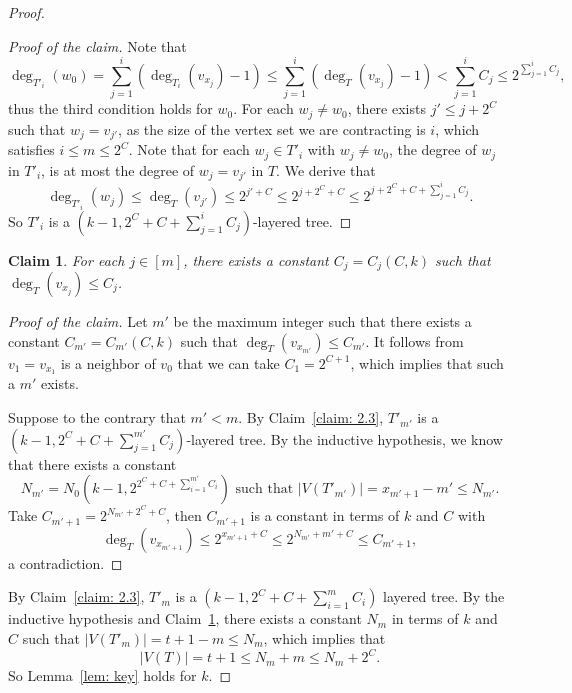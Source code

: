 \documentclass[11pt,a4paper]{article}
\newtheorem{claim}[definition]{Claim}
\newenvironment{poc}{\begin{proof}[Proof of the claim]\renewcommand*{\qedsymbol}{$\blacksquare$}}{\end{proof}}
\begin{document}
\begin{proof}
\begin{poc}
    Note that
        \[
        \deg_{T'_i}(w_0) = \sum_{j=1}^{i} \left(\deg_{T_i}(v_{x_j}) -1 \right) \le \sum_{j=1}^{i} \left(\deg_{T}(v_{x_j}) -1 \right) < \sum^{i}_{j=1}C_j\le 2^{\sum^{i}_{j=1}C_j}, 
        \]
        thus the third condition holds for $w_0$.
        For each $w_j \ne w_0$, there exists $j' \le j+2^C$ such that $w_j =v_{j'}$, as the size of the vertex set we are contracting is $i$, which satisfies $i\le m \le 2^C$.
        Note that for each $w_j \in T'_i$ with $w_j\ne w_0$, the degree of $w_j$ in $T'_i$, is at most the degree of $w_j=v_{j'}$ in $T$.
        We derive that
        \[
        \deg_{T'_i}(w_j)\le \deg_{T}(v_{j'})\le 2^{j'+C} \le 2^{j+2^C+C} \le  2^{j+2^C + C + \sum^{i}_{j=1}C_j}.
        \]
        So $T'_i$ is a $(k-1,2^C + C + \sum^{i}_{j=1}C_j)$-layered tree.
    \end{poc}
    \begin{claim}\label{claim: 2.4}
        For each $j\in [m]$, there exists a constant $C_j=C_j(C,k)$ such that $\deg_T(v_{x_j}) \le C_j$.
    \end{claim}
    \begin{poc}
        Let $m'$ be the maximum integer such that there exists a constant $C_{m'}=C_{m'}(C,k)$ such that $\deg_T(v_{x_{m'}}) \le C_{m'}$. It follows from $v_1=v_{x_1}$ is a neighbor of $v_0$ that we can take $C_1 = 2^{C+1}$, which implies that such a $m'$ exists.

        Suppose to the contrary that $m' <m$. By Claim~\ref{claim: 2.3}, $T'_{m'}$ is a $(k-1,2^C + C + \sum^{m'}_{j=1}C_j)$-layered tree.
        By the inductive hypothesis, we know that there exists a constant \[N_{m'} = N_0\left(k-1,2^{2^C + C + \sum^{m'}_{i=1}C_i}\right) \text{ such that }
        |V(T'_{m'})| = x_{m'+1}-m' \le N_{m'}.\] 
        Take $C_{m'+1} = 2^{N_{m'} +2^C+C} $, then $C_{m'+1}$ is a constant in terms of $k$ and $C$ with
        \[\deg_{T}(v_{x_{m'+1}}) \le 2^{x_{m'+1}+C} \le 2^{N_{m'}+m'+C} \le C_{m'+1}, \]
        a contradiction.
    \end{poc}
    By Claim~\ref{claim: 2.3}, $T'_m$ is a $(k-1,2^C + C + \sum^{m}_{i=1}C_i)$ layered tree. 
    By the inductive hypothesis and Claim~\ref{claim: 2.4}, there exists a constant $N_m$ in terms of $k$ and $C$ such that $|V(T'_m)| = t+1-m \le N_m$, which implies that
    \[
    |V(T)| = t+1 \le N_m+m \le N_m+2^C.
    \]
    So Lemma~\ref{lem: key} holds for $k$.
\end{proof}
\end{document}

